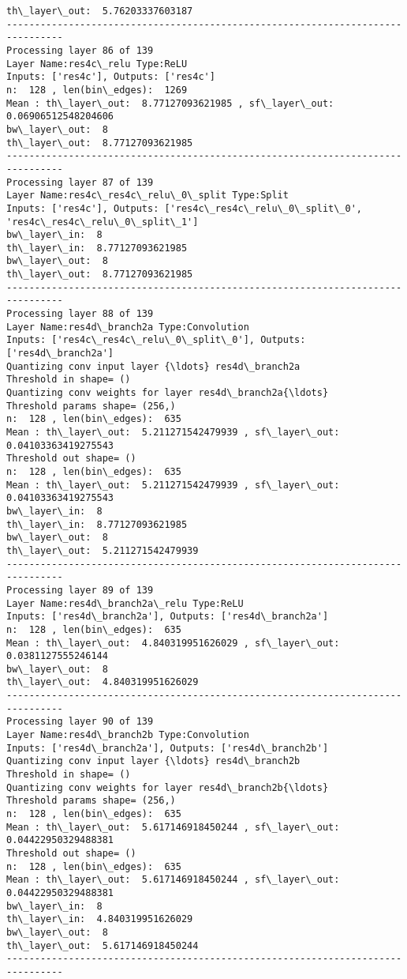 \documentclass[11pt]{article}
\begin{document}
\begin{Verbatim}[commandchars=\\\{\}]
th\_layer\_out:  5.76203337603187
--------------------------------------------------------------------------------
Processing layer 86 of 139
Layer Name:res4c\_relu Type:ReLU
Inputs: ['res4c'], Outputs: ['res4c']
n:  128 , len(bin\_edges):  1269
Mean : th\_layer\_out:  8.77127093621985 , sf\_layer\_out:  0.06906512548204606
bw\_layer\_out:  8
th\_layer\_out:  8.77127093621985
--------------------------------------------------------------------------------
Processing layer 87 of 139
Layer Name:res4c\_res4c\_relu\_0\_split Type:Split
Inputs: ['res4c'], Outputs: ['res4c\_res4c\_relu\_0\_split\_0', 'res4c\_res4c\_relu\_0\_split\_1']
bw\_layer\_in:  8
th\_layer\_in:  8.77127093621985
bw\_layer\_out:  8
th\_layer\_out:  8.77127093621985
--------------------------------------------------------------------------------
Processing layer 88 of 139
Layer Name:res4d\_branch2a Type:Convolution
Inputs: ['res4c\_res4c\_relu\_0\_split\_0'], Outputs: ['res4d\_branch2a']
Quantizing conv input layer {\ldots} res4d\_branch2a
Threshold in shape= ()
Quantizing conv weights for layer res4d\_branch2a{\ldots}
Threshold params shape= (256,)
n:  128 , len(bin\_edges):  635
Mean : th\_layer\_out:  5.211271542479939 , sf\_layer\_out:  0.04103363419275543
Threshold out shape= ()
n:  128 , len(bin\_edges):  635
Mean : th\_layer\_out:  5.211271542479939 , sf\_layer\_out:  0.04103363419275543
bw\_layer\_in:  8
th\_layer\_in:  8.77127093621985
bw\_layer\_out:  8
th\_layer\_out:  5.211271542479939
--------------------------------------------------------------------------------
Processing layer 89 of 139
Layer Name:res4d\_branch2a\_relu Type:ReLU
Inputs: ['res4d\_branch2a'], Outputs: ['res4d\_branch2a']
n:  128 , len(bin\_edges):  635
Mean : th\_layer\_out:  4.840319951626029 , sf\_layer\_out:  0.0381127555246144
bw\_layer\_out:  8
th\_layer\_out:  4.840319951626029
--------------------------------------------------------------------------------
Processing layer 90 of 139
Layer Name:res4d\_branch2b Type:Convolution
Inputs: ['res4d\_branch2a'], Outputs: ['res4d\_branch2b']
Quantizing conv input layer {\ldots} res4d\_branch2b
Threshold in shape= ()
Quantizing conv weights for layer res4d\_branch2b{\ldots}
Threshold params shape= (256,)
n:  128 , len(bin\_edges):  635
Mean : th\_layer\_out:  5.617146918450244 , sf\_layer\_out:  0.04422950329488381
Threshold out shape= ()
n:  128 , len(bin\_edges):  635
Mean : th\_layer\_out:  5.617146918450244 , sf\_layer\_out:  0.04422950329488381
bw\_layer\_in:  8
th\_layer\_in:  4.840319951626029
bw\_layer\_out:  8
th\_layer\_out:  5.617146918450244
--------------------------------------------------------------------------------

\end{Verbatim}
\end{document}
